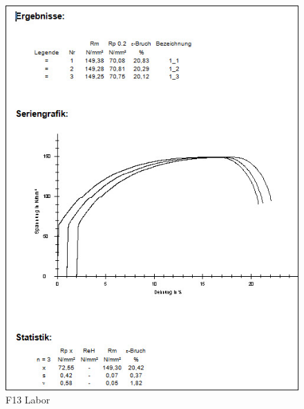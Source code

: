 \documentclass[12pt,a4paper,parskip]{scrartcl}
\begin{document}
\begin{figure}[hbtp]
\centering
\includegraphics[width=1\textwidth]{F13Labor.jpg}
\caption{F13 Labor}
\end{figure}
\end{document}
